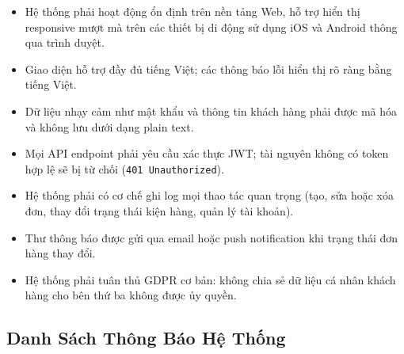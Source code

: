 \begin{itemize}
  \item Hệ thống phải hoạt động ổn định trên nền tảng Web, hỗ trợ hiển thị responsive mượt mà trên các thiết bị di động sử dụng iOS và Android thông qua trình duyệt.
  \item Giao diện hỗ trợ đầy đủ tiếng Việt; các thông báo lỗi hiển thị rõ ràng bằng tiếng Việt.
  \item Dữ liệu nhạy cảm như mật khẩu và thông tin khách hàng phải được mã hóa và không lưu dưới dạng plain text.
  \item Mọi API endpoint phải yêu cầu xác thực JWT; tài nguyên không có token hợp lệ sẽ bị từ chối (\texttt{401 Unauthorized}).
  \item Hệ thống phải có cơ chế ghi log mọi thao tác quan trọng (tạo, sửa hoặc xóa đơn, thay đổi trạng thái kiện hàng, quản lý tài khoản).
  \item Thư thông báo được gửi qua email hoặc push notification khi trạng thái đơn hàng thay đổi.
  \item Hệ thống phải tuân thủ GDPR cơ bản: không chia sẻ dữ liệu cá nhân khách hàng cho bên thứ ba không được ủy quyền.
\end{itemize}

\subsection{Danh Sách Thông Báo Hệ Thống}

